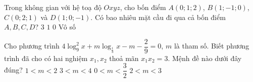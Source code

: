 	\begin{ex}%
		Trong không gian với hệ toạ độ $Oxyz$, cho bốn điểm $A(0;1;2)$, $B(1;-1;0)$, $C(0;2;1)$ và $D(1;0;-1)$. Có bao nhiêu mặt cầu đi qua cả bốn điểm $A, B, C, D$?
		\choice
		{$3$}
		{$1$}
		{$0$}
		{\True Vô số}
	\end{ex}
	
	\begin{ex}%
		Cho phương trình $4\log_9^2x+m\log_{\frac{1}{3}}x-m-\dfrac{2}{9}=0$, $m$ là tham số. Biết phương trình đã cho có hai nghiệm $x_1, x_2$ thoả mãn $x_1x_2=3$. Mệnh đề nào dưới đây đúng?
		\choice
		{$1<m<2$}
		{$3<m<4$}
		{\True $0<m<\dfrac{3}{2}$}
		{$2<m<3$}
	\end{ex}
	
